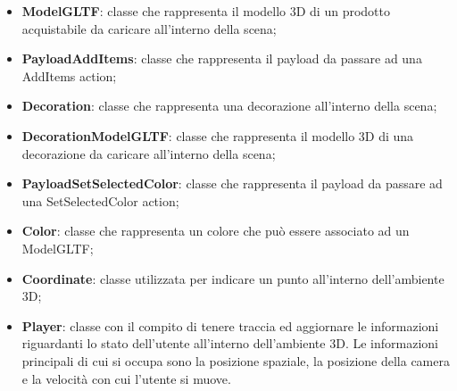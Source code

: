 \begin{itemize}
\begin{itemize}
			\item \textbf{ModelGLTF}: classe che rappresenta il modello 3D di un prodotto acquistabile da caricare all'interno della scena;
			\item \textbf{PayloadAddItems}: classe che rappresenta il payload da passare ad una AddItems action;
			\item \textbf{Decoration}: classe che rappresenta una decorazione all'interno della scena;
			\item \textbf{DecorationModelGLTF}: classe che rappresenta il modello 3D di una decorazione da caricare all'interno della scena;
			\item \textbf{PayloadSetSelectedColor}: classe che rappresenta il payload da passare ad una SetSelectedColor action;
			\item \textbf{Color}: classe che rappresenta un colore che può essere associato ad un ModelGLTF; 
			\item \textbf{Coordinate}: classe utilizzata per indicare un punto all'interno dell'ambiente 3D;
			\item \textbf{Player}: classe con il compito di tenere traccia ed aggiornare le informazioni riguardanti 
			lo stato dell'utente all'interno dell'ambiente 3D.
			Le informazioni principali di cui si occupa sono la posizione spaziale, la posizione della camera e
			la velocità con cui l'utente si muove.
		\end{itemize}
		

\end{itemize}
